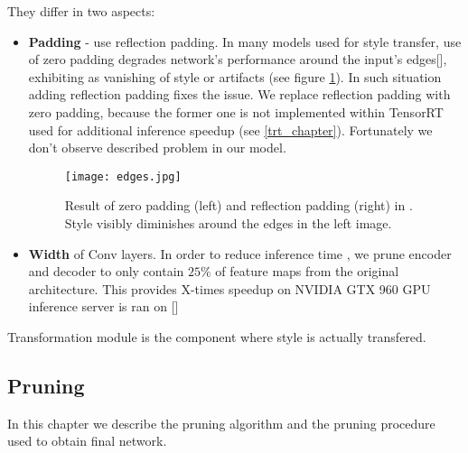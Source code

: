 \documentclass[../Main.tex]{subfiles}
\begin{document}
    They differ in two aspects:
    \begin{itemize}
        \item \textbf{Padding} - \cite{Li2018} use reflection padding. In many
        models used for style transfer, use of zero padding degrades network's
        performance around the input's edges[\cite{johnson2016perceptual}], exhibiting as
        vanishing of style or artifacts (see figure \ref{fig:edges}).
        In such situation adding reflection padding fixes the issue. We replace
        reflection padding with zero padding, because the former one is not 
        implemented within TensorRT used for additional inference speedup
        (see \ref{trt_chapter}). Fortunately we don't observe described problem
        in our model.
        \begin{figure}[h!]
            \texttt{[image: edges.jpg]}
            \caption{Result of zero padding (left) and reflection padding (right)
                in \cite{johnson2016perceptual}. Style visibly diminishes around
                the edges in the left image.
            }
            \label{fig:edges}
        \end{figure}
        \item \textbf{Width} of Conv layers. In order to reduce inference time ,
        we prune encoder and decoder 
        to only contain $25\%$ of feature maps from the original architecture.
        This provides 
        X-times speedup on NVIDIA GTX 960 GPU inference server is ran on
        []
        
    \end{itemize}


    Transformation module is the component where style is actually transfered.
    
    

\subsection{Pruning}
    In this chapter we describe the pruning algorithm and the pruning procedure 
    used to obtain final network.
\end{document}
